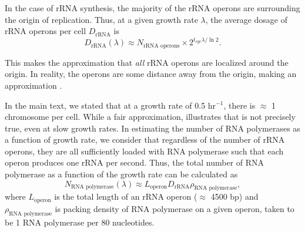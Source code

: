 In the case of rRNA synthesis, the majority of the rRNA operons are surrounding
the origin of replication. Thus, at a given growth rate $\lambda$, the average
dosage of rRNA operons per cell $D_\text{rRNA}$ is
\begin{equation}
D_\text{rRNA}(\lambda) \approx N_\text{rRNA operons} \times 2^{t_{cyc} \lambda / \ln 2}.
\label{eq:rRNA_dosage}
\end{equation}

This makes the approximation that \textit{all} rRNA operons are localized around
the origin. In reality, the operons are some distance away from the origin,
making  an approximation \citep{dennis2004}.

In the main text, we stated that at a growth rate of 0.5 hr$^{-1}$, there is
$\approx$ 1 chromosome per cell. While a fair approximation, 
illustrates that is not precisely true, even at slow growth rates. In estimating
the number of RNA polymerases as a function of growth rate, we consider that
regardless of the number of rRNA operons, they are all sufficiently loaded with
RNA polymerase such that each operon produces one rRNA per second. Thus, the
total number of RNA polymerase as a function of the growth rate can be
calculated as
\begin{equation}
    N_\text{RNA polymerase}(\lambda) \approx L_\text{operon}D_\text{rRNA}\rho_\text{RNA polymerase},
\end{equation}
where $L_\text{operon}$ is the total length of an rRNA operon ($\approx$ 4500
bp) and $\rho_\text{RNA polymerase}$ is packing density of RNA polymerase on a
given operon, taken to be 1 RNA polymerase per 80 nucleotides.
